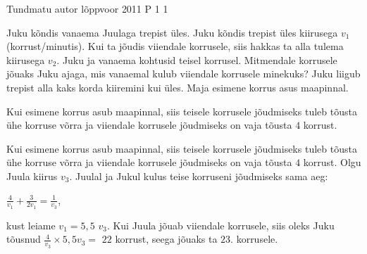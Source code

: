 {Tundmatu autor} %
{lõppvoor} %
{2011} %
{P 1} %
{1} %
{

\ifStatement
Juku kõndis vanaema Juulaga trepist üles. Juku kõndis trepist üles kiirusega $v_1$ (korrust/minutis). Kui ta jõudis viiendale korrusele, siis hakkas ta alla tulema kiirusega $v_2$. Juku ja vanaema kohtusid teisel korrusel. Mitmendale korrusele jõuaks Juku ajaga, mis vanaemal kulub viiendale korrusele minekuks? Juku liigub trepist alla kaks korda kiiremini kui üles. Maja esimene korrus asus maapinnal.
\fi

\ifHint
Kui esimene korrus asub maapinnal, siis teisele korrusele jõudmiseks tuleb tõusta ühe korruse võrra ja viiendale korrusele jõudmiseks on vaja tõusta $4$ korrust.
\fi

\ifSolution
Kui esimene korrus asub maapinnal, siis teisele korrusele jõudmiseks tuleb tõusta ühe korruse võrra ja viiendale korrusele jõudmiseks on vaja tõusta $4$ korrust. Olgu Juula kiirus $v_3$. Juulal ja Jukul kulus teise korruseni jõudmiseks sama aeg:
\begin{center}
$\frac{4}{v_1} + \frac{3}{2v_1} = \frac{1}{v_3}$,
\end{center}
kust leiame $v_1 = 5,5$ $v_3$. Kui Juula jõuab viiendale korrusele, siis oleks Juku tõusnud $\frac{4}{v_3} \times 5,5 v_3 =$ $22$ korrust, seega jõuaks ta $23$. korrusele.
\fi
}
